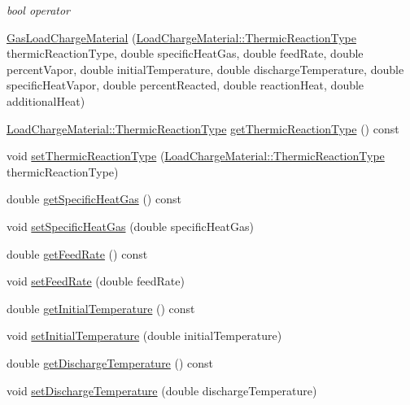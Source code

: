 \begin{DoxyCompactItemize}
\begin{DoxyCompactList}\small\item\em bool operator \end{DoxyCompactList}\item 
\hyperlink{class_gas_load_charge_material_aec7d944af0d8b649d8f971240f52d995}{Gas\+Load\+Charge\+Material} (\hyperlink{class_load_charge_material_a51d4263e865a5d86236622dd3fe23fd1}{Load\+Charge\+Material\+::\+Thermic\+Reaction\+Type} thermic\+Reaction\+Type, double specific\+Heat\+Gas, double feed\+Rate, double percent\+Vapor, double initial\+Temperature, double discharge\+Temperature, double specific\+Heat\+Vapor, double percent\+Reacted, double reaction\+Heat, double additional\+Heat)
\item 
\hyperlink{class_load_charge_material_a51d4263e865a5d86236622dd3fe23fd1}{Load\+Charge\+Material\+::\+Thermic\+Reaction\+Type} \hyperlink{class_gas_load_charge_material_ac801f30ccf58ce98fdb6b8cdb0a9767f}{get\+Thermic\+Reaction\+Type} () const
\item 
void \hyperlink{class_gas_load_charge_material_ac48eb07a3008f1dc0ff433353b59536d}{set\+Thermic\+Reaction\+Type} (\hyperlink{class_load_charge_material_a51d4263e865a5d86236622dd3fe23fd1}{Load\+Charge\+Material\+::\+Thermic\+Reaction\+Type} thermic\+Reaction\+Type)
\item 
double \hyperlink{class_gas_load_charge_material_a66e956e7a52b1032a3e8a725f26fa580}{get\+Specific\+Heat\+Gas} () const
\item 
void \hyperlink{class_gas_load_charge_material_a07bf6d4ee9161683fbeb3baad16ea7be}{set\+Specific\+Heat\+Gas} (double specific\+Heat\+Gas)
\item 
double \hyperlink{class_gas_load_charge_material_ae14ebe9b7091a491166174968505b6ee}{get\+Feed\+Rate} () const
\item 
void \hyperlink{class_gas_load_charge_material_a922b728dfd109d1c1684d7dfad82ec8e}{set\+Feed\+Rate} (double feed\+Rate)
\item 
double \hyperlink{class_gas_load_charge_material_af8a83c3720d108baa196394105822db7}{get\+Initial\+Temperature} () const
\item 
void \hyperlink{class_gas_load_charge_material_aec9ddfce5e31099b6a047e3d98d80d47}{set\+Initial\+Temperature} (double initial\+Temperature)
\item 
double \hyperlink{class_gas_load_charge_material_a6baaf6ad65e2a3d1fa90b7c007bc3c53}{get\+Discharge\+Temperature} () const
\item 
void \hyperlink{class_gas_load_charge_material_a6c53344d5370a1e9b7321a530a6843c0}{set\+Discharge\+Temperature} (double discharge\+Temperature)

\end{DoxyCompactItemize}

